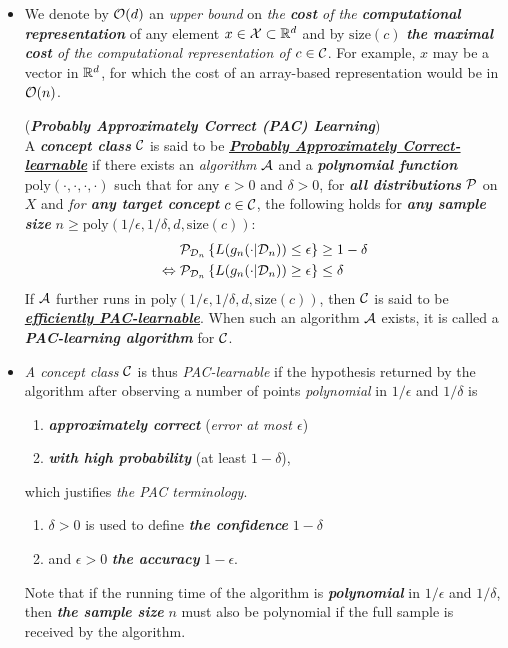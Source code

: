 \documentclass[11pt]{article}
\begin{document}
\begin{itemize}
\item We denote by ${\mathcal O}(d)$ an \emph{upper bound} on \emph{the \textbf{cost} of the \textbf{computational representation}} of any element $x \in {\mathcal X} \subset {\mathbb R}^d$ and by $\text{size}(c)$ \emph{\textbf{the maximal cost} of the computational representation of $c \in {\mathcal C}$}. For example, $x$ may be a vector in ${\mathbb R}^d$,
for which the cost of an array-based representation would be in ${\mathcal O}(n)$.
\begin{definition} (\emph{\textbf{Probably Approximately Correct (PAC) Learning}})\\
A \textit{\textbf{concept class}} ${\mathcal C}$ is said to be \underline{\emph{\textbf{Probably Approximately Correct-learnable}}} if there exists an \emph{algorithm} ${\mathcal A}$ and
a \emph{\textbf{polynomial function}} $\text{poly}(\cdot, \cdot, \cdot, \cdot)$ such that for any $\epsilon > 0$ and $\delta > 0$, for \emph{\textbf{all distributions}} ${\mathcal P}$ on $X$ and \emph{for \textbf{any target concept}} $c \in {\mathcal C}$, the following holds for \emph{\textbf{any sample size}} 
$n \ge \text{poly}(1/\epsilon, 1/\delta, d, \text{size}(c)):$
\begin{align}
{\mathcal P}_{{\mathcal D}_{n}}\left\{ L(g_n(\cdot|{\mathcal D}_{n})) \le \epsilon\right\} &\ge  1 - \delta  \label{eqn: pac_definition}\\
\Leftrightarrow {\mathcal P}_{{\mathcal D}_{n}}\left\{ L(g_n(\cdot|{\mathcal D}_{n})) \ge \epsilon\right\} &\le   \delta  \nonumber
\end{align}
If ${\mathcal A}$ further runs in $\text{poly}(1/\epsilon, 1/\delta, d, \text{size}(c))$, then ${\mathcal C}$ is said to be \underline{\emph{\textbf{efficiently PAC-learnable}}}. When such an algorithm ${\mathcal A}$ exists, it is called a \emph{\textbf{PAC-learning algorithm}} for ${\mathcal C}$.
\end{definition}

\item \begin{remark}
\emph{A concept class} ${\mathcal C}$ is thus \emph{PAC-learnable} if the hypothesis returned by the algorithm after observing a number of points \emph{polynomial} in $1/\epsilon$ and $1/\delta$ is
\begin{enumerate}
\item \emph{\textbf{approximately correct}} (\emph{error at most $\epsilon$}) 
\item \emph{\textbf{with high probability}} (at least $1 - \delta$), 
\end{enumerate}
which justifies \emph{the PAC terminology}. 
\begin{enumerate}
\item $\delta > 0$ is used to define \emph{\textbf{the confidence}} $1 - \delta$
\item and $\epsilon > 0$ \emph{\textbf{the accuracy}} $1-\epsilon$. 
\end{enumerate}
Note that if the running time of the algorithm is \emph{\textbf{polynomial}} in $1/\epsilon$ and $1/\delta$, then \emph{\textbf{the sample size}} $n$ must also be polynomial if the full sample is received by the algorithm.
\end{remark}


\end{itemize}
\end{document}
